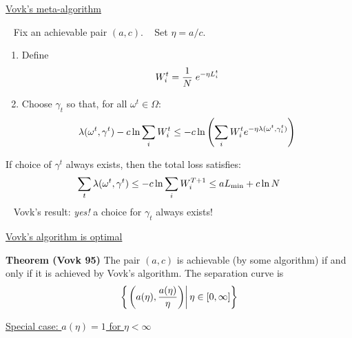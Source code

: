 \begin{flushleft}
\begin{LARGE}

\pagebreak

\begin{center}
\underline{Vovk's meta-algorithm}
\end{center}

~\newline
Fix an achievable pair $(a,c)$.\newline
~\newline
Set $\eta=a/c$.
~\newline

\begin{enumerate}
\item
Define
\[
	W_{i}^{t} = {1 \over N} \; e^{-\eta L_{i}^{t}}
\]
\item
Choose $\gamma_t$ so that, for all $\omega^t \in \Omega$:
\[
\lambda(\omega^t,\gamma^t) - c \ln \sum_i W_{i}^{t} 
\leq
- c \ln \left( \sum_i 
      W_{i}^{t}e^{-\eta \lambda(\omega^t,\gamma_i^t)}
        \right)
\]
\end{enumerate}

If choice of $\gamma^t$ always exists, then the total loss satisfies:
\[
\sum_t \lambda(\omega^t,\gamma^t)
\leq
- c \ln \sum_i W_{i}^{T+1}
\leq
a L_{\min} + c \ln N
\]
~\newline
Vovk's result: {\em yes!} a choice for $\gamma_t$ always exists!
\pagebreak

\begin{center}
\underline{Vovk's algorithm is optimal}
\end{center}
{\bf Theorem (Vovk 95)}\newline
The pair $(a,c)$ is achievable (by some algorithm) 
if and only if it is achieved by Vovk's algorithm.
\newline
The separation curve is
\[ \left\{ \left. \left( a(\eta),{a(\eta) \over \eta} \right) \right| 
           \eta \in [0,\infty] \right\} \]


\pagebreak
\begin{center}
\underline{Special case: $a(\eta) = 1$ for $\eta<\infty$}
\end{center}


\end{LARGE}
\end{flushleft}
